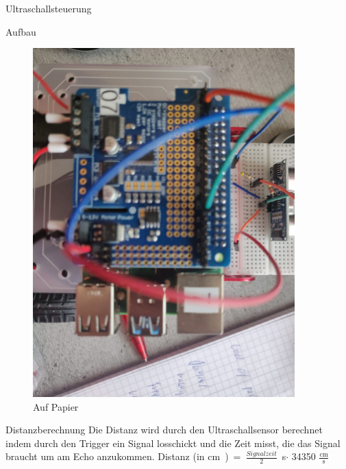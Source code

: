 \documentclass[12pt,twoside]{report}
\begin{document}
\begin{section}{Ultraschallsteuerung}
\begin{subsection}{Aufbau}
\begin{figure}
\begin{minipage}{0.45\textwidth}
                \includegraphics[width=0.9\textwidth]{lernportfolio_assets/Schaltplan_Ultraschallsensor2} %
                \caption{Auf Papier}
            \end{minipage}
        \end{figure}
    \end{subsection}
    \begin{subsection}{Distanzberechnung}
        Die Distanz wird durch den Ultraschallsensor berechnet indem durch den Trigger ein Signal losschickt und die Zeit misst, die das Signal braucht um am Echo anzukommen. 
        Distanz (in \si\cm)= \( \frac{Signalzeit}{2} \) \si\second $ \cdot $ 34350 \( \frac{\si\cm}{\si\second} \)
    \end{subsection}


\end{section}
\end{document}
